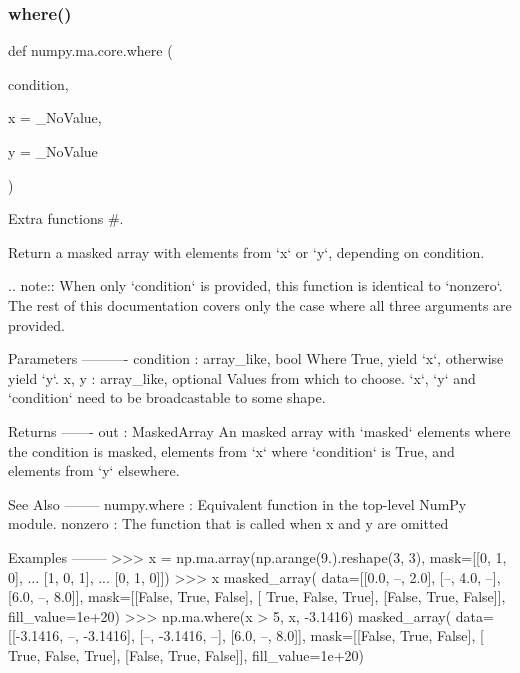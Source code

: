 \subsubsection{\texorpdfstring{where()}{where()}}
{\footnotesize\ttfamily def numpy.\+ma.\+core.\+where (\begin{DoxyParamCaption}\item[{}]{condition,  }\item[{}]{x = {\ttfamily \+\_\+NoValue},  }\item[{}]{y = {\ttfamily \+\_\+NoValue} }\end{DoxyParamCaption})}



Extra functions \#. 

\begin{DoxyVerb}Return a masked array with elements from `x` or `y`, depending on condition.

.. note::
    When only `condition` is provided, this function is identical to
    `nonzero`. The rest of this documentation covers only the case where
    all three arguments are provided.

Parameters
----------
condition : array_like, bool
    Where True, yield `x`, otherwise yield `y`.
x, y : array_like, optional
    Values from which to choose. `x`, `y` and `condition` need to be
    broadcastable to some shape.

Returns
-------
out : MaskedArray
    An masked array with `masked` elements where the condition is masked,
    elements from `x` where `condition` is True, and elements from `y`
    elsewhere.

See Also
--------
numpy.where : Equivalent function in the top-level NumPy module.
nonzero : The function that is called when x and y are omitted

Examples
--------
>>> x = np.ma.array(np.arange(9.).reshape(3, 3), mask=[[0, 1, 0],
...                                                    [1, 0, 1],
...                                                    [0, 1, 0]])
>>> x
masked_array(
  data=[[0.0, --, 2.0],
        [--, 4.0, --],
        [6.0, --, 8.0]],
  mask=[[False,  True, False],
        [ True, False,  True],
        [False,  True, False]],
  fill_value=1e+20)
>>> np.ma.where(x > 5, x, -3.1416)
masked_array(
  data=[[-3.1416, --, -3.1416],
        [--, -3.1416, --],
        [6.0, --, 8.0]],
  mask=[[False,  True, False],
        [ True, False,  True],
        [False,  True, False]],
  fill_value=1e+20)\end{DoxyVerb}
 

